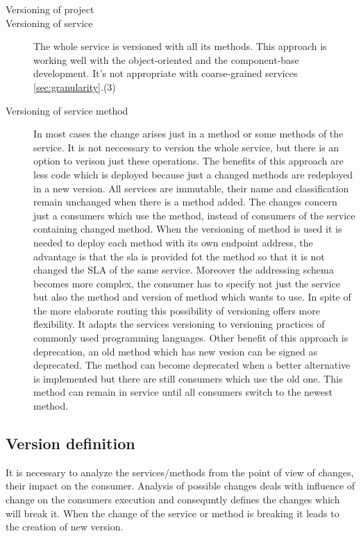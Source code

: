 \begin{description}
  \item[Versioning of project]
  \item[Versioning of service] 
  The whole service is versioned with all its methods. This approach is working well with the object-oriented and the component-base development. It's not appropriate with coarse-grained services \ref{sec:granularity}.(3)
  \item[Versioning of service method] 
  In most cases the change arises just in a method or some methods of the service. It is not neccessary to version the whole service, but there is an option to verison just these operations.
  The benefits of this approach are less code which is deployed because just a changed methods are redeployed in a new version. All services are immutable, their name and classification remain unchanged when there is a method added. The changes concern just a consumers which use the method, instead of consumers of the service containing changed method. 
  When the versioning of method is used it is needed to deploy each method with its own endpoint address, the advantage is that the \gls{sla} is provided fot the method so that it is not changed the SLA of the same service.
  Moreover the addressing schema becomes more complex, the consumer has to specify not just the service but also the method and version of method which wants to use.
In spite of the more elaborate routing this possibility of versioning offers more flexibility. It adapts the services versioning to versioning practices of commonly used programming languages. 
Other benefit of this approach is deprecation, an old method which has new vesion can be signed as deprecated. The method can become deprecated when a better alternative is implemented but there are still consumers which use the old one. This method can remain in service until all consumers switch to the newest method.
\end{description}

\subsection{Version definition}
It is necessary to analyze the services/methods from the point of view of changes, their impact on the consumer. Analysis of possible changes deals with influence of change on the consumers execution and consequntly defines the changes which will break it. When the change of the service or method is breaking it leads to the creation of new version.

